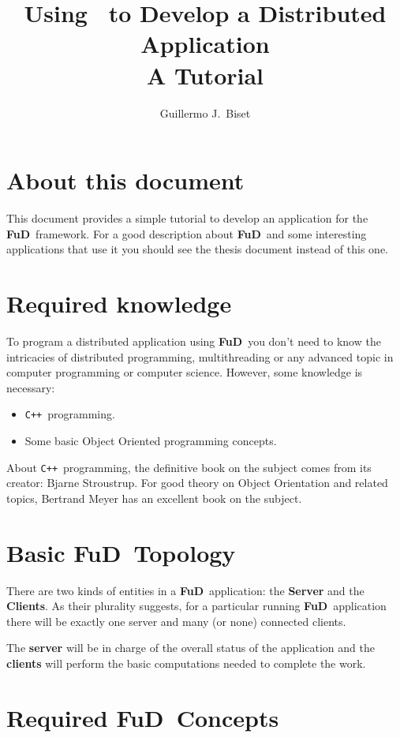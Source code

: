 \documentclass[a4paper,12pt,english]{article}
\title{Using \fud \ to Develop a Distributed Application\\ \small{A Tutorial}}
\author{Guillermo J.~Biset}
\newcommand{\fud}{\textbf{FuD}}
\newcommand{\cpp}{\texttt{C++}}
\begin{document}
\maketitle

\section{About this document}

This document provides a simple tutorial to develop an application for the \fud \ framework. For a good description about \fud  \ and some interesting applications that use it you should see the thesis document instead of this one.

\section{Required knowledge}
To program a distributed application using \fud \ you don't need to know the intricacies of distributed programming, multithreading or any advanced topic in computer programming or computer science. However, some knowledge is necessary:
\begin{itemize}
 \item \cpp \ programming.
 \item Some basic Object Oriented programming concepts.
\end{itemize}

About \cpp \ programming, the definitive book on the subject comes from its creator: Bjarne Stroustrup\cite{cplusplus}. For good theory on Object Orientation and related topics, Bertrand Meyer has an excellent book on the subject\cite{oosc}.

\section{Basic \fud \ Topology}

There are two kinds of entities in a \fud \ application: the \textbf{Server} and the \textbf{Clients}. As their plurality suggests, for a particular running \fud \ application there will be exactly one server and many (or none) connected clients.

The \textbf{server} will be in charge of the overall status of the application and the \textbf{clients} will perform the basic computations needed to complete the work.

\section{Required \fud \ Concepts}
\end{document}
